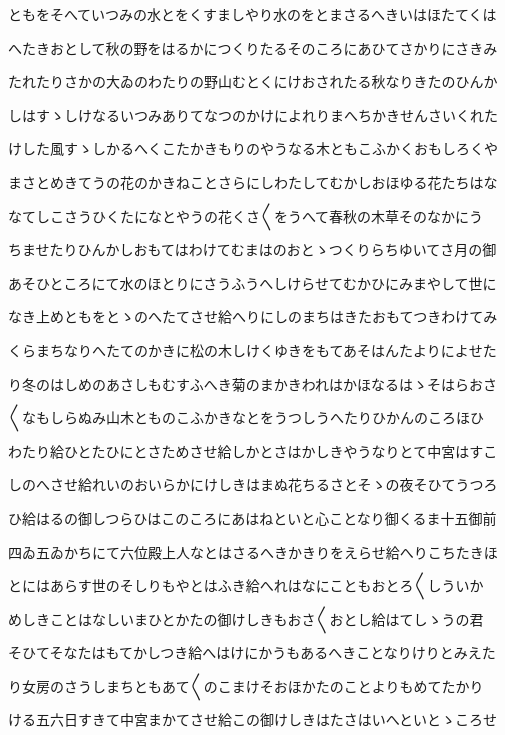 \documentclass[a4paper,11pt,landscape]{ltjtarticle}
\begin{document}
ともをそへていつみの水とをくすましやり水のをとまさるへきいはほたてくは
\par\medskip
へたきおとして秋の野をはるかにつくりたるそのころにあひてさかりにさきみ
\par\medskip
たれたりさかの大ゐのわたりの野山むとくにけおされたる秋なりきたのひんか
\par\medskip
しはすゝしけなるいつみありてなつのかけによれりまへちかきせんさいくれた
\par\medskip
けした風すゝしかるへくこたかきもりのやうなる木ともこふかくおもしろくや
\par\medskip
まさとめきてうの花のかきねことさらにしわたしてむかしおほゆる花たちはな
\par\medskip
なてしこさうひくたになとやうの花くさ〱をうへて春秋の木草そのなかにう
\par\medskip
ちませたりひんかしおもてはわけてむまはのおとゝつくりらちゆいてさ月の御
\par\medskip
あそひところにて水のほとりにさうふうへしけらせてむかひにみまやして世に
\par\medskip
なき上めともをとゝのへたてさせ給へりにしのまちはきたおもてつきわけてみ
\par\medskip
くらまちなりへたてのかきに松の木しけくゆきをもてあそはんたよりによせた
\par\medskip
り冬のはしめのあさしもむすふへき菊のまかきわれはかほなるはゝそはらおさ
\par\medskip
〱なもしらぬみ山木とものこふかきなとをうつしうへたりひかんのころほひ
\par\medskip
わたり給ひとたひにとさためさせ給しかとさはかしきやうなりとて中宮はすこ
\par\medskip
しのへさせ給れいのおいらかにけしきはまぬ花ちるさとそゝの夜そひてうつろ
\par\medskip
ひ給はるの御しつらひはこのころにあはねといと心ことなり御くるま十五御前
\par\medskip
四ゐ五ゐかちにて六位殿上人なとはさるへきかきりをえらせ給へりこちたきほ
\par\medskip
とにはあらす世のそしりもやとはふき給へれはなにこともおとろ〱しういか
\par\medskip
めしきことはなしいまひとかたの御けしきもおさ〱おとし給はてしゝうの君
\par\medskip
そひてそなたはもてかしつき給へはけにかうもあるへきことなりけりとみえた
\par\medskip
り女房のさうしまちともあて〱のこまけそおほかたのことよりもめてたかり
\par\medskip
ける五六日すきて中宮まかてさせ給この御けしきはたさはいへといとゝころせ
\end{document}
